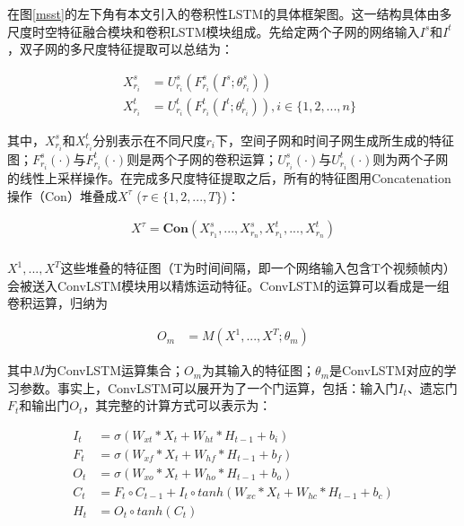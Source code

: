 在图\ref{msst}的左下角有本文引入的卷积性LSTM的具体框架图。这一结构具体由多尺度时空特征融合模块和卷积LSTM模块组成。先给定两个子网的网络输入$I^s$和$I^t$，双子网的多尺度特征提取可以总结为：

\begin{equation}
 \label{eq3_4}
 \begin{aligned}
 \quad X^{s}_{r_i} &=  U^{s}_{r_i}(F^{s}_{r_i}(I^s;\theta^{s}_{r_i})) \\
        \quad X^{t}_{r_i} &=  U^{t}_{r_i}(F^{t}_{r_i}(I^t;\theta^{t}_{r_i})), i \in \{1, 2, ..., n\}
 \end{aligned}
\end{equation}

其中，$X^{s}_{r_i}$和$X^{t}_{r_i}$分别表示在不同尺度$r_i$下，空间子网和时间子网生成所生成的特征图；$F^{s}_{r_i}(\cdot)$与$F^{t}_{r_i}(\cdot)$则是两个子网的卷积运算；$U^ {s}_{r_i}(\cdot)$与$U^{t}_{r_i}(\cdot)$则为两个子网的线性上采样操作。在完成多尺度特征提取之后，所有的特征图用Concatenation操作（Con）堆叠成$X^\tau $ ($\tau  \in \{1, 2, ..., T\}$)：

\begin{equation}
 \label{eq3_3}
 \begin{aligned}
    X^\tau  = \textbf{Con}(X^{s}_{r_1}, ...,X^{s}_{r_n},X^{t}_{r_1}, ...,X^{t}_{r_n})\\
 \end{aligned}
\end{equation}

$X^1, ..., X^T$这些堆叠的特征图（T为时间间隔，即一个网络输入包含T个视频帧内）会被送入ConvLSTM模块用以精炼运动特征。ConvLSTM的运算可以看成是一组卷积运算，归纳为

\begin{equation}
\label{P_motion}
\begin{aligned}
   O_{m}  &= M(X^1, ..., X^T; \theta_m)
 \end{aligned}
\end{equation}

其中$M$为ConvLSTM运算集合；$O_{m}$为其输入的特征图；$\theta_m$是ConvLSTM对应的学习参数。事实上，ConvLSTM可以展开为了一个门运算，包括：输入门$I_t$、遗忘门$F_t$和输出门$O_t$，其完整的计算方式可以表示为：

\begin{equation}
\label{s_lstm}
\begin{aligned}
   I_{t}  &= \sigma(W_{xt} * X_t + W_{ht} * H_{t-1} + b_i) \\
   F_{t}  &= \sigma(W_{xf} * X_t + W_{hf} * H_{t-1} + b_f) \\
   O_{t}  &= \sigma(W_{xo} * X_t + W_{ho} * H_{t-1} + b_o) \\
   C_{t}  &= F_{t} \circ C_{t-1} + I_{t} \circ tanh(W_{xc}* X_t + W_{hc} * H_{t-1} + b_c) \\
   H_t &= O_t \circ tanh(C_t)
 \end{aligned}
\end{equation}

